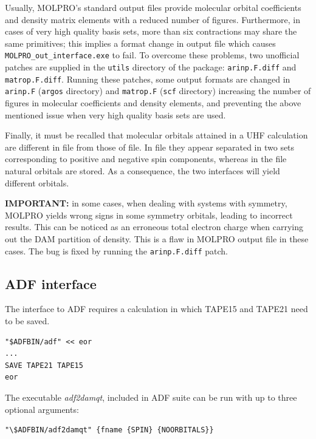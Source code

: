 \documentclass[10pt]{article}
\begin{document}
Usually, MOLPRO's standard output files provide molecular orbital coefficients and 
density matrix elements with a reduced number of figures. Furthermore, in cases of very 
high quality basis sets, more than six contractions may share the same primitives; 
this implies a format change in output file which causes 
\texttt{MOLPRO\_out\_interface.exe} to fail. To overcome these problems, two unofficial 
patches are supplied in the \texttt{utils} directory of the package: 
\texttt{arinp.F.diff} and \texttt{matrop.F.diff}. Running these patches, some output 
formats are changed in \texttt{arinp.F} (\texttt{argos} directory) and \texttt{matrop.F} 
(\texttt{scf} directory) increasing the number of figures in molecular coefficients 
and density elements, and preventing the above mentioned 
issue when very high quality basis sets are used.

Finally, it must be recalled that molecular orbitals attained in a 
UHF calculation are different in \out{ } file 
from those of \xml{ } file. In \out{ } file they appear separated in two sets corresponding 
to positive and negative spin components, whereas in the \xml{ } file natural orbitals 
are stored. As a consequence, the two interfaces will yield different orbitals.

{\bf IMPORTANT:} in some cases, when dealing with systems with symmetry, MOLPRO yields wrong 
signs in some symmetry orbitals, leading to incorrect results. This can be noticed as an 
erroneous total electron charge when carrying out the DAM partition of density. 
This is a flaw in MOLPRO output file in these cases. The bug is fixed by running 
the \texttt{arinp.F.diff} patch.

\subsection{ADF interface \label{sec:5.3}}

The interface to ADF requires a calculation in which 
TAPE15 and TAPE21 need to be saved. 

\begin{verbatim}
"$ADFBIN/adf" << eor
...
SAVE TAPE21 TAPE15
eor
\end{verbatim}

The executable {\it adf2damqt}, included in ADF suite can be run with up to three optional arguments: 

\begin{verbatim}
"\$ADFBIN/adf2damqt" {fname {SPIN} {NOORBITALS}}
\end{verbatim}
\end{document}
